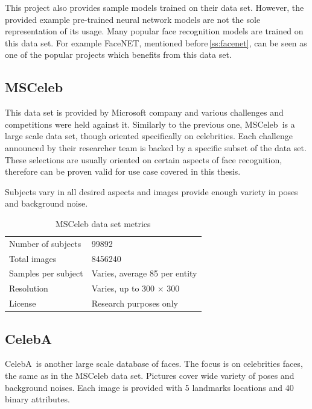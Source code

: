 This project also provides sample models trained on their data set. However, the provided example pre-trained neural network models are not the sole representation of its usage. Many popular face recognition models are trained on this data set. For example FaceNET, mentioned before\,\ref{ss:facenet}, can be seen as one of the popular projects which benefits from this data set.

\subsection{MSCeleb}

This data set is provided by Microsoft company and various challenges and competitions were held against it. Similarly to the previous one, MSCeleb\,\cite{msceleb} is a large scale data set, though oriented specifically on celebrities. Each challenge announced by their researcher team is backed by a specific subset of the data set. These selections are usually oriented on certain aspects of face recognition, therefore can be proven valid for use case covered in this thesis.

Subjects vary in all desired aspects and images provide enough variety in poses and background noise.

\begin{table}[ht]
    \centering
    \begin{tabularx}{.8\textwidth}{l|X}
        \toprule
        Number of subjects & \num{99892} \\
        Total images & \num{8456240} \\
        Samples per subject & Varies, average 85 per entity \\
        Resolution & Varies, up to 300 $\times$ 300 \\
        License & Research purposes only \\
        \bottomrule
    \end{tabularx}
    \caption{MSCeleb data set metrics}
\end{table}

\subsection{CelebA}

CelebA\,\cite{celeba} is another large scale database of faces. The focus is on celebrities faces, the same as in the MSCeleb data set. Pictures cover wide variety of poses and background noises. Each image is provided with 5 landmarks locations and 40 binary attributes.


